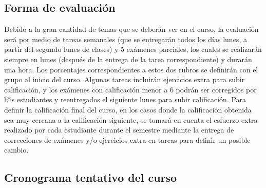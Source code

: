 \documentclass[12pt]{article}
\begin{document}
\subsection{Forma de evaluación}

Debido a la gran cantidad de temas que se deberán ver en el curso, la evaluación será por medio de tareas semanales (que se entregarán todos los días lunes, a partir del segundo lunes de clases) y 5 exámenes parciales, los cuales se realizarán siempre en lunes (después de la entrega de la tarea correspondiente) y durarán una hora. Los porcentajes correspondientes a estos dos rubros se definirán con el grupo al inicio del curso. Algunas tareas incluirán ejercicios extra para subir calificación, y los exámenes con calificación menor a 6 podrán ser corregidos por l@s estudiantes y reentregados el siguiente lunes para subir calificación. Para definir la calificación final del curso, en los casos donde la calificación obtenida sea muy cercana a la calificación siguiente, se tomará en cuenta el esfuerzo extra realizado por cada estudiante durante el semestre mediante la entrega de correcciones de exámenes y/o ejercicios extra en tareas para definir un posible cambio.



\newpage
\subsection{Cronograma tentativo del curso}
\end{document}

